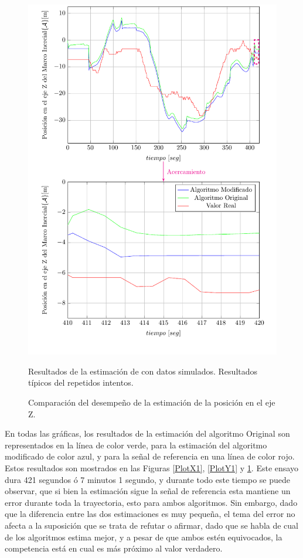\documentclass[10pt]{report}
\numberwithin{equation}{chapter}
\numberwithin{algorithm}{chapter}
\begin{document}
\begin{figure}
\begin{center}
\includegraphics[scale=0.8]
{PlotZ4b.pdf}
\caption{Comparación del desempeño de la estimación de la posición en el eje Z.}
\scriptsize{Resultados de la estimación de con datos simulados. Resultados típicos del repetidos intentos.}
\label{PlotZ1}
\end{center}
\end{figure}
En todas las gráficas, los resultados de la estimación del algoritmo Original son representados en la línea de color verde, para la estimación del algoritmo modificado de color azul, y para la señal de referencia en una línea de color rojo. Estos resultados son mostrados en las Figuras \ref{PlotX1}, \ref{PlotY1} y \ref{PlotZ1}. Este ensayo dura 421 segundos ó 7 minutos 1 segundo, y durante todo este tiempo se puede observar, que si bien la estimación sigue la señal de referencia esta mantiene un error durante toda la trayectoria, esto para ambos algoritmos. Sin embargo, dado que la diferencia entre las dos estimaciones es muy pequeña, el tema del error no afecta a la suposición que se trata de refutar o afirmar, dado que se habla de cual de los algoritmos estima mejor, y a pesar de que ambos estén equivocados, la competencia está en cual es más próximo al valor verdadero.\par
\end{document}
